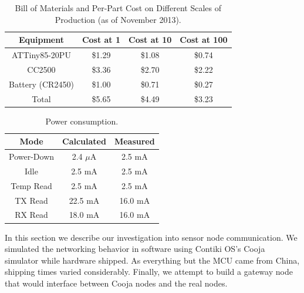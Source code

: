 %
%
\begin{table}%
  \begin{center}
  
  \begin{tabular}{| c | c | c | c |}

  \hline
  \textbf{Equipment} & \textbf{Cost at 1} & \textbf{Cost at 10} & \textbf{Cost at 100} \\
  \hline
  ATTiny85-20PU     & \$1.29 & \$1.08 & \$0.74 \\
  CC2500            & \$3.36 & \$2.70 & \$2.22 \\
  Battery (CR2450)  & \$1.00 & \$0.71 & \$0.27 \\
  Total             & \$5.65 & \$4.49 & \$3.23 \\
  \hline
  
  \end{tabular}  
  \end{center}
  \caption{Bill of Materials and Per-Part Cost on Different Scales of Production (as of November 2013).
  \label{table:bill}
  }
\end{table}

%
%
\begin{table}
  \begin{center}
  
  \begin{tabular}{| c | c | c |}

  \hline
  \textbf{Mode} & \textbf{Calculated} & \textbf{Measured} \\
  \hline
  Power-Down        & 2.4 $\mu$A & 2.5 mA\\
  Idle              & 2.5 mA & 2.5 mA\\
  Temp Read         & 2.5 mA & 2.5 mA \\
  TX Read           & 22.5 mA & 16.0 mA\\
  RX Read           & 18.0 mA &  16.0 mA\\
  \hline
  
  \end{tabular}  
  \end{center}
  \caption{Power consumption.
  \label{table:power_consumption}
  }
\end{table}

In this section we describe our investigation into sensor node communication. We simulated the networking behavior in software using Contiki OS's Cooja simulator while hardware shipped. As everything but the MCU came from China, shipping times varied considerably. Finally, we attempt to build a gateway node that would interface between Cooja nodes and the real nodes.

